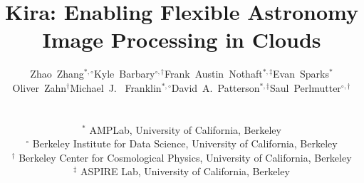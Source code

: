 \documentclass[10pt, conference, compsocconf]{IEEEtran}
\newcommand{\up}{\vspace*{-1em}}
\begin{document}
%

\title{Kira: Enabling Flexible Astronomy Image Processing in Clouds}

%
%
%
%
%

\author{
\begin{tabular}{cccc}
{Zhao~Zhang$^{*,\circ}$} & {Kyle~Barbary$^{\circ,\dagger}$} & {Frank~Austin~Nothaft$^{*,\ddagger}$} & {Evan~Sparks$^*$} \\
{Oliver~Zahn$^\dagger$} & {Michael~J.~ Franklin$^{*,\circ}$} & {David~A.~Patterson$^{*,\ddagger}$} & {Saul~Perlmutter$^{\circ,\dagger}$}
\end{tabular}
\\%
\begin{tabular}{c}
$^*$ AMPLab, University of California, Berkeley \\
$^\circ$ Berkeley Institute for Data Science, University of California, Berkeley\\
$^\dagger$ Berkeley Center for Cosmological Physics, University of California, Berkeley\\
$^\ddagger$ ASPIRE Lab, University of California, Berkeley \\
\up\up
\end{tabular}
} 
\end{document}
